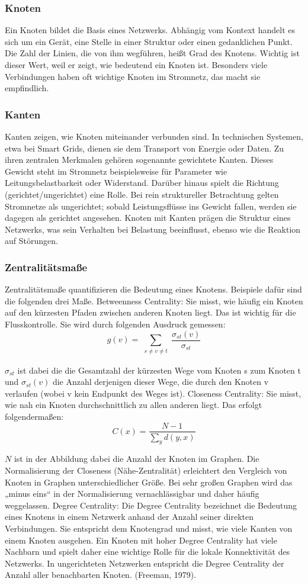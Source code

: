 \subsubsection{Knoten}
Ein Knoten bildet die Basis eines Netzwerks. Abhängig vom Kontext handelt es sich um ein Gerät, eine Stelle in einer Struktur oder einen gedanklichen Punkt. Die Zahl der Linien, die von ihm wegführen, heißt Grad des Knotens. Wichtig ist dieser Wert, weil er zeigt, wie bedeutend ein Knoten ist. Besonders viele Verbindungen haben oft wichtige Knoten im Stromnetz, das macht sie empfindlich.
\subsubsection{Kanten} 
Kanten zeigen, wie Knoten miteinander verbunden sind. In technischen Systemen, etwa bei Smart Grids, dienen sie dem Transport von Energie oder Daten. Zu ihren zentralen Merkmalen gehören sogenannte gewichtete Kanten. Dieses Gewicht steht im Stromnetz beispielsweise für Parameter wie Leitungsbelastbarkeit oder Widerstand. Darüber hinaus spielt die Richtung (gerichtet/ungerichtet) eine Rolle. Bei rein struktureller Betrachtung gelten Stromnetze als ungerichtet; sobald Leistungsflüsse ins Gewicht fallen, werden sie dagegen als gerichtet angesehen.
Knoten mit Kanten prägen die Struktur eines Netzwerks, was sein Verhalten bei Belastung beeinflusst, ebenso wie die Reaktion auf Störungen.
\subsubsection{Zentralitätsmaße}
Zentralitätsmaße quantifizieren die Bedeutung eines Knotens. Beispiele dafür sind die folgenden drei Maße.
	Betweenness Centrality: Sie misst, wie häufig ein Knoten auf den kürzesten Pfaden zwischen anderen Knoten liegt. Das ist wichtig für die Flusskontrolle. Sie wird durch folgenden Ausdruck gemessen:
\[
g(v) = \sum_{\substack{s \neq v \neq t}} \frac{\sigma_{st}(v)}{\sigma_{st}}
\]

$\sigma_{st}$ ist dabei die die Gesamtzahl der kürzesten Wege vom Knoten s zum Knoten t und $\sigma_{st}(v)$ die Anzahl derjenigen dieser Wege, die durch den Knoten v verlaufen (wobei v kein Endpunkt des Weges ist).
Closeness Centrality: Sie misst, wie nah ein Knoten durchschnittlich zu allen anderen liegt. Das erfolgt folgendermaßen: 
\[
C(x) = \frac{N - 1}{\sum_{y} d(y, x)}
\]

$N$ ist in der Abbildung dabei die Anzahl der Knoten im Graphen. Die Normalisierung der Closeness (Nähe-Zentralität) erleichtert den Vergleich von Knoten in Graphen unterschiedlicher Größe. Bei sehr großen Graphen wird das „minus eins“ in der Normalisierung vernachlässigbar und daher häufig weggelassen.
Degree Centrality: Die Degree Centrality bezeichnet die Bedeutung eines Knotens in einem Netzwerk anhand der Anzahl seiner direkten Verbindungen. Sie entspricht dem Knotengrad und misst, wie viele Kanten von einem Knoten ausgehen. Ein Knoten mit hoher Degree Centrality hat viele Nachbarn und spielt daher eine wichtige Rolle für die lokale Konnektivität des Netzwerks. In ungerichteten Netzwerken entspricht die Degree Centrality der Anzahl aller benachbarten Knoten. (Freeman, 1979).
